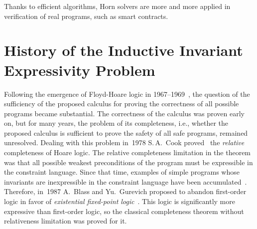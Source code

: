 Thanks to efficient algorithms, Horn solvers are more and more applied in verification of real programs, such as smart contracts.

\section{History of the Inductive Invariant Expressivity Problem }\label{sec:background/historyExpressivity}
Following the emergence of Floyd-Hoare logic in \numrange{1967}{1969}~\cite{Floyd1993,10.1145/363235.363259}, the question of the sufficiency of the proposed calculus for proving the correctness of all possible programs became substantial. The correctness of the calculus was proven early on, but for many years, the problem of its completeness, i.e., whether the proposed calculus is sufficient to prove the safety of all safe programs, remained unresolved. Dealing with this problem in~1978 S.\,A.~Cook proved~\cite{doi:10.1137/0207005} the \emph{relative} completeness of Hoare logic.
The relative completeness limitation in the theorem was that all possible weakest preconditions of the program must be expressible in the constraint language.
Since that time, examples of simple programs whose invariants are inexpressible in the constraint language have been accumulated~\cite{10.1145/371282.371285}.
Therefore, in~1987 A.~Blass and Yu.~Gurevich proposed to abandon first-order logic in favor of \emph{existential fixed-point logic}~\cite{Blass1987,blass2000the}. This logic is significantly more expressive than first-order logic, so the classical completeness theorem without relativeness limitation was proved for it.



